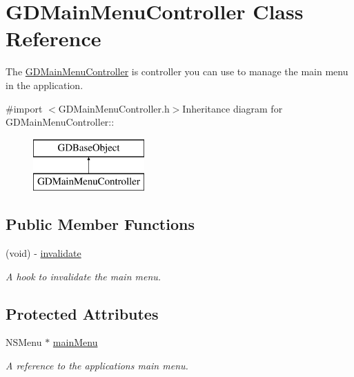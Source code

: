 \hypertarget{interface_g_d_main_menu_controller}{
\section{GDMainMenuController Class Reference}
\label{interface_g_d_main_menu_controller}
}


The \hyperlink{interface_g_d_main_menu_controller}{GDMainMenuController} is controller you can use to manage the main menu in the application.  


{\ttfamily \#import $<$GDMainMenuController.h$>$}Inheritance diagram for GDMainMenuController::\begin{figure}[H]
\begin{center}
\leavevmode
\includegraphics[height=2cm]{interface_g_d_main_menu_controller}
\end{center}
\end{figure}
\subsection*{Public Member Functions}
\begin{DoxyCompactItemize}
\item 
(void) -\/ \hyperlink{interface_g_d_main_menu_controller_aa1a7ba88d3c69ffc38b7ee617f9fc551}{invalidate}
\begin{DoxyCompactList}\small\item\em A hook to invalidate the main menu. \item\end{DoxyCompactList}\end{DoxyCompactItemize}
\subsection*{Protected Attributes}
\begin{DoxyCompactItemize}
\item 
\hypertarget{interface_g_d_main_menu_controller_aa57dce90a510259aed26ec8fb047de01}{
NSMenu $\ast$ \hyperlink{interface_g_d_main_menu_controller_aa57dce90a510259aed26ec8fb047de01}{mainMenu}}
\label{interface_g_d_main_menu_controller_aa57dce90a510259aed26ec8fb047de01}

\begin{DoxyCompactList}\small\item\em A reference to the applications main menu. \item\end{DoxyCompactList}\end{DoxyCompactItemize}


